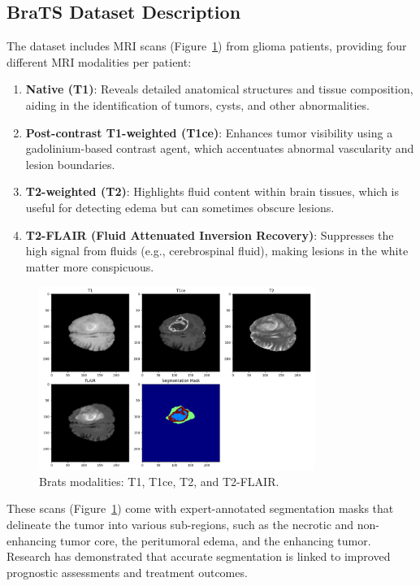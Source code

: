\subsection{BraTS Dataset Description}
The dataset includes MRI scans (Figure~\ref{fig:modalities}) from glioma patients, providing four different MRI modalities per patient:
\begin{enumerate}
  \item \textbf{Native (T1)}: Reveals detailed anatomical structures and tissue composition, aiding in the identification of tumors, cysts, and other abnormalities.
  \item \textbf{Post-contrast T1-weighted (T1ce)}: Enhances tumor visibility using a gadolinium-based contrast agent, which accentuates abnormal vascularity and lesion boundaries.
  \item \textbf{T2-weighted (T2)}: Highlights fluid content within brain tissues, which is useful for detecting edema but can sometimes obscure lesions.
  \item \textbf{T2-FLAIR (Fluid Attenuated Inversion Recovery)}: Suppresses the high signal from fluids (e.g., cerebrospinal fluid), making lesions in the white matter more conspicuous.
\end{enumerate}
\begin{figure}[H]
  \centering
  \includegraphics[width=0.8\textwidth]{Images/Chapter3/modalities.png}
  \caption{Brats modalities: T1, T1ce, T2, and T2-FLAIR.}
  \label{fig:modalities}
\end{figure}

These scans (Figure~\ref{fig:modalities}) come with expert-annotated segmentation masks that delineate the tumor into various sub-regions, such as the necrotic and non-enhancing tumor core, the peritumoral edema, and the enhancing tumor. Research has demonstrated that accurate segmentation is linked to improved prognostic assessments and treatment outcomes.


